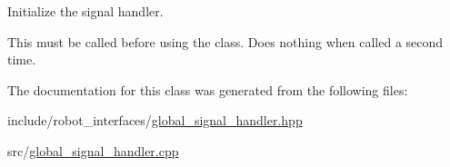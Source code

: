 Initialize the signal handler. 

This must be called before using the class. Does nothing when called a second time. 

The documentation for this class was generated from the following files\+:\begin{DoxyCompactItemize}
\item 
include/robot\+\_\+interfaces/\hyperlink{global__signal__handler_8hpp}{global\+\_\+signal\+\_\+handler.\+hpp}\item 
src/\hyperlink{global__signal__handler_8cpp}{global\+\_\+signal\+\_\+handler.\+cpp}\end{DoxyCompactItemize}
